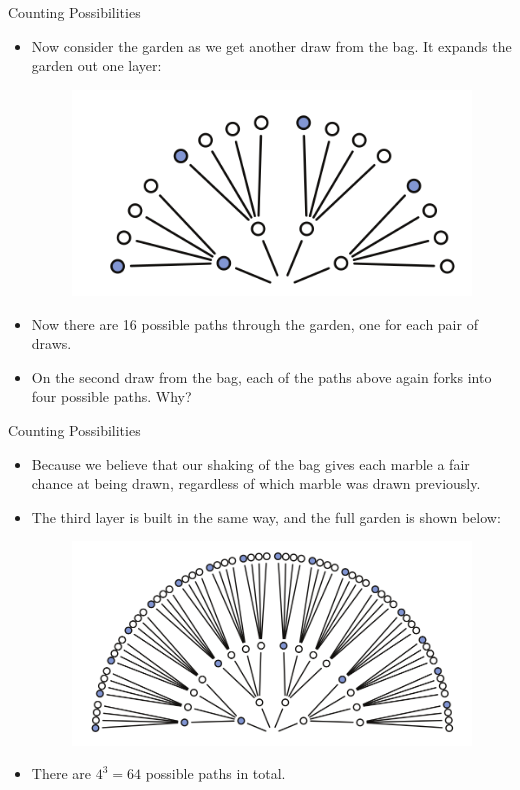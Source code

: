 \documentclass[handout]{beamer}
\begin{document}
\begin{frame}{Counting Possibilities}
\scriptsize{
\begin{itemize}
 \item Now consider the garden as we get another draw from the bag. It expands the garden out one layer:

\begin{figure}[h!]
	\centering
	\includegraphics[scale=0.4]{pics/marbles7.png}
\end{figure}

\item Now there are 16 possible paths through the garden, one for each pair of draws.

\item On the second draw from the bag, each of the paths above again forks into four possible paths. Why?

\end{itemize}
 } 
\end{frame}


\begin{frame}{Counting Possibilities}
\scriptsize{
\begin{itemize}
 \item Because we believe that our shaking of the bag gives each marble a fair chance at being drawn, regardless of which marble was drawn previously. \item The third layer is built in the same way, and the full garden is shown
 below:
\begin{figure}[h!]
	\centering
	\includegraphics[scale=0.3]{pics/marbles8.png}
\end{figure}

\item There are $4^3 = 64$ possible paths in total.

\end{itemize}
 } 
\end{frame}
\end{document}
